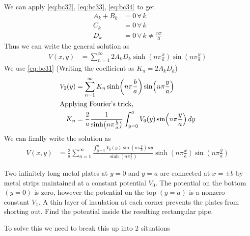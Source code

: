 \documentclass[../main.tex]{subfiles}
\begin{document}
\begin{questions}
\begin{solution}
		We can apply \eqref{eq:bc32}, \eqref{eq:bc33}, \eqref{eq:bc34} to get
		\begin{align}
			A_k + B_k &= 0 \,\forall\,k\\
			C_k &= 0 \,\forall\,k\\
			D_k &= 0 \,\forall\,k\neq\frac{n\pi}{a}
		\end{align}
		Thus we can write the general solution as
		\begin{align}
			V(x,y) &= \sum^{\infty}_{n=1} 2A_kD_k \sinh(n\pi\frac{x}{a})\sin(n\pi\frac{y}{a})
		\end{align}
		We use \eqref{eq:bc31} (Writing the coefficient as $K_n=2A_kD_k$)
		\begin{align}
			V_0(y) &= \sum_{n=1}^{\infty} K_n \sinh(n\pi\frac{b}{a})\sin(n\pi\frac{y}{a})\\
			\intertext{Applying Fourier's trick,}
			K_n &= \frac{2}{a}\frac{1}{\sinh(n\pi\frac{b}{a})}\int_{y=0}^{a} V_0(y)\sin(n\pi\frac{y}{a})\,dy
		\end{align}
		We can finally write the solution as
		\begin{align}
			V(x,y) &= \frac{2}{a}\sum_{n=1}^{\infty} \frac{\int_{y=0}^{a} V_0(y)\sin(n\pi\frac{y}{a})\,dy}{\sinh(n\pi\frac{b}{a})} \sinh(n\pi\frac{x}{a})\sin(n\pi\frac{y}{a})
		\end{align}
	\end{solution}

	\question Two infinitely long metal plates at $y = 0$ and $y = a$ are connected at $x = \pm b$ by metal strips maintained at a constant potential $V_0$. The potential on the bottom $(y = 0)$ is zero, however the potential on the top $(y =a)$ is a nonzero constant $V_1$. A thin layer of insulation at each corner prevents the plates from shorting out. Find the potential inside the resulting rectangular pipe.
	\begin{solution}
		To solve this we need to break this up into 2 situations
		\begin{center}
\end{center}
\end{solution}
\end{questions}
\end{document}
